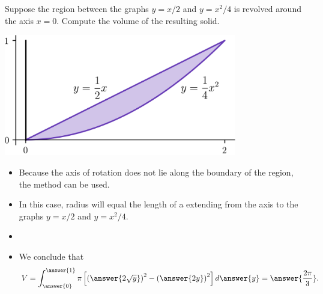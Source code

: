 \documentclass{ximera}
\begin{document}
\begin{example}
Suppose the region between the graphs $y = x/2$ and $y=x^2/4$ is revolved around the axis $x=0$. Compute the volume of the resulting solid.
\begin{center}
\begin{image}
\includegraphics[width=4in]{diskwasher/washer1.png}
\end{image}
\end{center}
\begin{itemize}
\item Because the axis of rotation does not lie along the boundary of the region, the  method can be used.
\item In this case, radius will equal the length of a  extending from the axis to the graphs $y = x/2$ and $y = x^2/4$.
\item 
\begin{multipleChoice}
\end{multipleChoice}
\item We conclude that
\[ V = \int_{\answer{0}}^{\answer{1}} \pi \left[  \left( \answer{2 \sqrt{y}} \right)^2 - \left( \answer{2 y} \right)^2  \right] d\answer{y} = \answer{\frac{2 \pi}{3}}. \]
\end{itemize}
\end{example}
\end{document}
